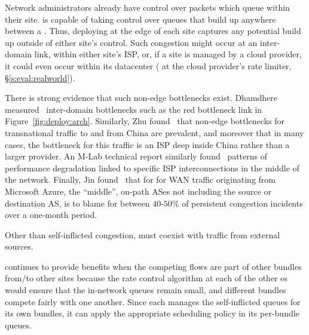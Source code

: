 Network administrators already have control over packets which queue within their site. \name is capable of taking control over queues that build up anywhere between a \pair. Thus, deploying \name at the edge of each site captures any potential build up outside of either site's control. Such congestion might occur at an inter-domain link, within either site's ISP, or, if a site is managed by a cloud provider, it could even occur within its datacenter (\eg{} at the cloud provider's rate limiter, \S\ref{s:eval:realworld}). 

There is strong evidence that such non-edge bottlenecks exist.
Dhamdhere \etal measured~\cite{inferring-interdomain-congestion} inter-domain bottlenecks such as the red bottleneck link in Figure~\ref{fig:deploy:arch}.
Similarly, Zhu \etal found~\cite{bottleneck-of-china} that non-edge bottlenecks for transnational traffic to and from China are prevalent, and moreover that in many cases, the bottleneck for this traffic is an ISP deep inside China rather than a larger provider.
An M-Lab technical report similarly found~\cite{mlab-tr} patterns of performance degradation linked to specific ISP interconnections in the middle of the network.
Finally, Jin \etal found~\cite{blameit} that for for WAN traffic originating from Microsoft Azure, the ``middle'', \ie on-path ASes not including the source or destination AS, is to blame for between $40$-$50\%$ of persistent congestion incidents over a one-month period. 

 Other than self-inflicted congestion, \name must coexist with traffic from external sources.

\vspace{2pt}
\name continues to provide benefits when the competing flows are part of other bundles from/to other sites because the rate control algorithm at each of the other {\inbox}es would ensure that the in-network queues remain small, and different bundles compete fairly with one another. Since each \inbox manages the self-inflicted queues for its own bundles, it can apply the appropriate scheduling policy in its per-bundle queues.

